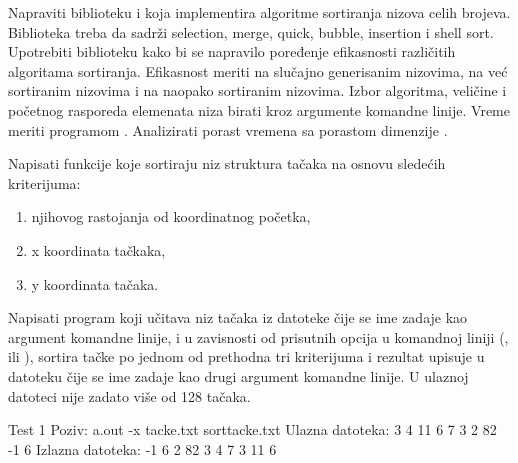 \begin{Exercise}[label=506]
  Napraviti biblioteku  i  koja
  implementira algoritme sortiranja nizova celih brojeva. Biblioteka
  treba da sadrži selection, merge, quick, bubble, insertion i shell
  sort. Upotrebiti biblioteku kako bi se napravilo poređenje
  efikasnosti različitih algoritama sortiranja. Efikasnost meriti na
  slučajno generisanim nizovima, na već sortiranim nizovima i na
  naopako sortiranim nizovima. Izbor algoritma, veličine i početnog
  rasporeda elemenata niza birati kroz argumente komandne linije.
  Vreme meriti programom . Analizirati porast vremena sa
  porastom dimenzije .
  
\end{Exercise}

\begin{Exercise}[label=507]
  Napisati funkcije koje sortiraju niz struktura tačaka na
  osnovu sledećih kriterijuma:
  \begin{enumerate}
  \item njihovog rastojanja od koordinatnog početka,
  \item x koordinata tačkaka,
  \item y koordinata tačaka.
  \end{enumerate}
  Napisati program koji učitava niz tačaka iz datoteke čije se ime
  zadaje kao argument komandne linije, i u zavisnosti od prisutnih
  opcija u komandnoj liniji (,  ili ),
  sortira tačke po jednom od prethodna tri kriterijuma i rezultat
  upisuje u datoteku čije se ime zadaje kao drugi argument komandne
  linije. U ulaznoj datoteci nije zadato više od 128 tačaka.
  
\begin{miditest}
\begin{test}{Test 1}
Poziv:  a.out -x tacke.txt sorttacke.txt
Ulazna datoteka:
3 4
11 6
7 3
2 82
-1 6
Izlazna datoteka:
-1 6
2 82
3 4
7 3
11 6
\end{test}
\end{miditest}
  
\end{Exercise}

